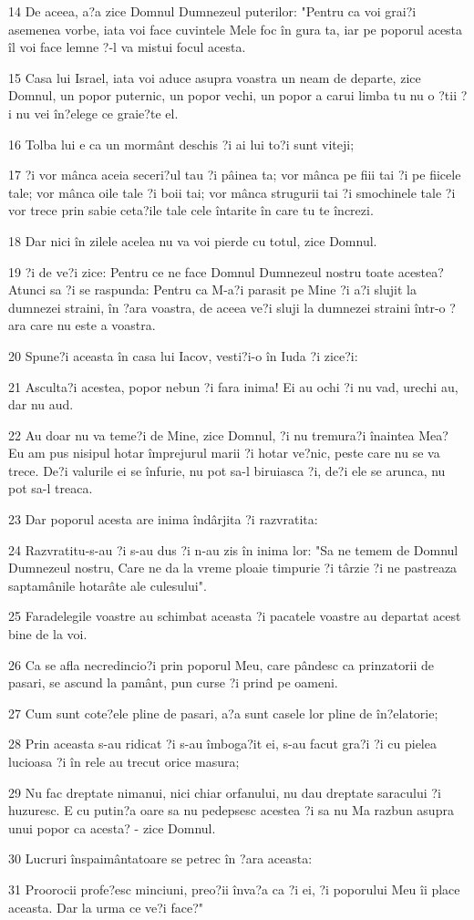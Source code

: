\par 14 De aceea, a?a zice Domnul Dumnezeul puterilor: "Pentru ca voi grai?i asemenea vorbe, iata voi face cuvintele Mele foc în gura ta, iar pe poporul acesta îl voi face lemne ?-l va mistui focul acesta.
\par 15 Casa lui Israel, iata voi aduce asupra voastra un neam de departe, zice Domnul, un popor puternic, un popor vechi, un popor a carui limba tu nu o ?tii ?i nu vei în?elege ce graie?te el.
\par 16 Tolba lui e ca un mormânt deschis ?i ai lui to?i sunt viteji;
\par 17 ?i vor mânca aceia seceri?ul tau ?i pâinea ta; vor mânca pe fiii tai ?i pe fiicele tale; vor mânca oile tale ?i boii tai; vor mânca strugurii tai ?i smochinele tale ?i vor trece prin sabie ceta?ile tale cele întarite în care tu te încrezi.
\par 18 Dar nici în zilele acelea nu va voi pierde cu totul, zice Domnul.
\par 19 ?i de ve?i zice: Pentru ce ne face Domnul Dumnezeul nostru toate acestea? Atunci sa ?i se raspunda: Pentru ca M-a?i parasit pe Mine ?i a?i slujit la dumnezei straini, în ?ara voastra, de aceea ve?i sluji la dumnezei straini într-o ?ara care nu este a voastra.
\par 20 Spune?i aceasta în casa lui Iacov, vesti?i-o în Iuda ?i zice?i:
\par 21 Asculta?i acestea, popor nebun ?i fara inima! Ei au ochi ?i nu vad, urechi au, dar nu aud.
\par 22 Au doar nu va teme?i de Mine, zice Domnul, ?i nu tremura?i înaintea Mea? Eu am pus nisipul hotar împrejurul marii ?i hotar ve?nic, peste care nu se va trece. De?i valurile ei se înfurie, nu pot sa-l biruiasca ?i, de?i ele se arunca, nu pot sa-l treaca.
\par 23 Dar poporul acesta are inima îndârjita ?i razvratita:
\par 24 Razvratitu-s-au ?i s-au dus ?i n-au zis în inima lor: "Sa ne temem de Domnul Dumnezeul nostru, Care ne da la vreme ploaie timpurie ?i târzie ?i ne pastreaza saptamânile hotarâte ale culesului".
\par 25 Faradelegile voastre au schimbat aceasta ?i pacatele voastre au departat acest bine de la voi.
\par 26 Ca se afla necredincio?i prin poporul Meu, care pândesc ca prinzatorii de pasari, se ascund la pamânt, pun curse ?i prind pe oameni.
\par 27 Cum sunt cote?ele pline de pasari, a?a sunt casele lor pline de în?elatorie;
\par 28 Prin aceasta s-au ridicat ?i s-au îmboga?it ei, s-au facut gra?i ?i cu pielea lucioasa ?i în rele au trecut orice masura;
\par 29 Nu fac dreptate nimanui, nici chiar orfanului, nu dau dreptate saracului ?i huzuresc. E cu putin?a oare sa nu pedepsesc acestea ?i sa nu Ma razbun asupra unui popor ca acesta? - zice Domnul.
\par 30 Lucruri înspaimântatoare se petrec în ?ara aceasta:
\par 31 Proorocii profe?esc minciuni, preo?ii înva?a ca ?i ei, ?i poporului Meu îi place aceasta. Dar la urma ce ve?i face?"

